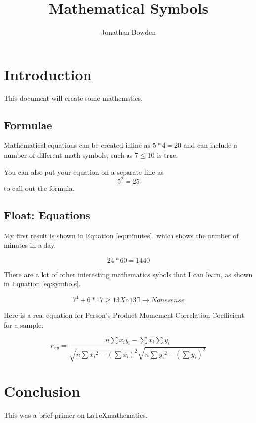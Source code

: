 \documentclass{article}
\title{Mathematical Symbols}
\author{Jonathan Bowden}
\begin{document}
\maketitle

\section{Introduction}

This document will create some mathematics.

\subsection{Formulae}

Mathematical equations can be created inline as $5*4=20$ and can include a number of different math symbols, such as $7 \leq  10$ is true.


You can also put your equation on a separate line as \[5^2 = 25\] to call out the formula.

\subsection{Float: Equations}

My first result is shown in Equation \ref{eq:minutes}, which shows the number of minutes in a day.

\begin{equation}
	24*60 = 1440
	\label{eq:minutes}
\end{equation}

There are a lot of other interesting mathematics sybols that I can learn, as shown in Equation \ref{eq:symbols}.

\begin{equation}
	7^4+6*17\geq 13 X \alpha 13 \exists \rightarrow Nonesense
	\label{eq:symbols}
\end{equation}

Here is a real equation for Person's Product Momement Correlation Coefficient for a sample:

\begin{equation}
	r_{xy} = \frac{n\sum{x_i y_i}- \sum{x_i} \sum{y_i}}
		{\sqrt{n\sum{x_i}^2 - (\sum{x_i})^2}\sqrt{n\sum{{y_i}^2 - (\sum{y_i})^2}}}
\end{equation}

\section{Conclusion}

This was a brief primer on \LaTeX mathematics.
\end{document}
